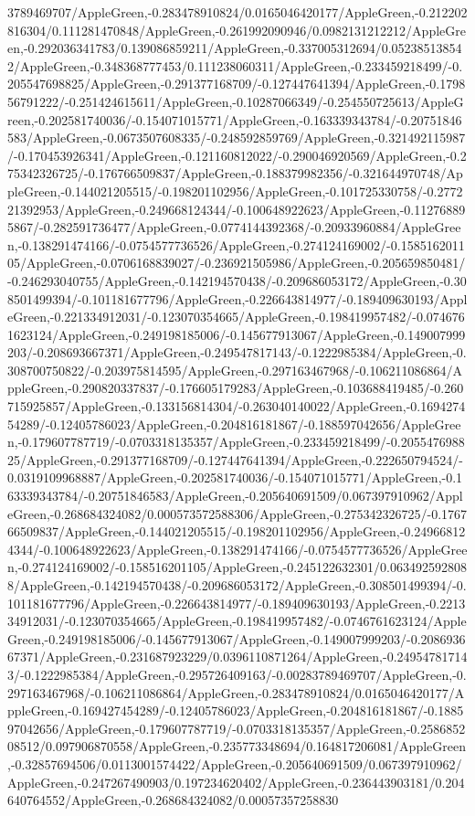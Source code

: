 {\begin{tikzternal}
{3789469707/AppleGreen,-0.283478910824/0.0165046420177/AppleGreen,-0.212202816304/0.111281470848/AppleGreen,-0.261992090946/0.0982131212212/AppleGreen,-0.292036341783/0.139086859211/AppleGreen,-0.337005312694/0.052385138542/AppleGreen,-0.348368777453/0.111238060311/AppleGreen,-0.233459218499/-0.205547698825/AppleGreen,-0.291377168709/-0.127447641394/AppleGreen,-0.179856791222/-0.251424615611/AppleGreen,-0.10287066349/-0.254550725613/AppleGreen,-0.202581740036/-0.154071015771/AppleGreen,-0.163339343784/-0.20751846583/AppleGreen,-0.0673507608335/-0.248592859769/AppleGreen,-0.321492115987/-0.170453926341/AppleGreen,-0.121160812022/-0.290046920569/AppleGreen,-0.275342326725/-0.176766509837/AppleGreen,-0.188379982356/-0.321644970748/AppleGreen,-0.144021205515/-0.198201102956/AppleGreen,-0.101725330758/-0.277221392953/AppleGreen,-0.249668124344/-0.100648922623/AppleGreen,-0.112768895867/-0.282591736477/AppleGreen,-0.0774144392368/-0.20933960884/AppleGreen,-0.138291474166/-0.0754577736526/AppleGreen,-0.274124169002/-0.158516201105/AppleGreen,-0.0706168839027/-0.236921505986/AppleGreen,-0.205659850481/-0.246293040755/AppleGreen,-0.142194570438/-0.209686053172/AppleGreen,-0.308501499394/-0.101181677796/AppleGreen,-0.226643814977/-0.189409630193/AppleGreen,-0.221334912031/-0.123070354665/AppleGreen,-0.198419957482/-0.0746761623124/AppleGreen,-0.249198185006/-0.145677913067/AppleGreen,-0.149007999203/-0.208693667371/AppleGreen,-0.249547817143/-0.1222985384/AppleGreen,-0.308700750822/-0.203975814595/AppleGreen,-0.297163467968/-0.106211086864/AppleGreen,-0.290820337837/-0.176605179283/AppleGreen,-0.103688419485/-0.260715925857/AppleGreen,-0.133156814304/-0.263040140022/AppleGreen,-0.169427454289/-0.12405786023/AppleGreen,-0.204816181867/-0.188597042656/AppleGreen,-0.179607787719/-0.0703318135357/AppleGreen,-0.233459218499/-0.205547698825/AppleGreen,-0.291377168709/-0.127447641394/AppleGreen,-0.222650794524/-0.0319109968887/AppleGreen,-0.202581740036/-0.154071015771/AppleGreen,-0.163339343784/-0.20751846583/AppleGreen,-0.205640691509/0.067397910962/AppleGreen,-0.268684324082/0.000573572588306/AppleGreen,-0.275342326725/-0.176766509837/AppleGreen,-0.144021205515/-0.198201102956/AppleGreen,-0.249668124344/-0.100648922623/AppleGreen,-0.138291474166/-0.0754577736526/AppleGreen,-0.274124169002/-0.158516201105/AppleGreen,-0.245122632301/0.0634925928088/AppleGreen,-0.142194570438/-0.209686053172/AppleGreen,-0.308501499394/-0.101181677796/AppleGreen,-0.226643814977/-0.189409630193/AppleGreen,-0.221334912031/-0.123070354665/AppleGreen,-0.198419957482/-0.0746761623124/AppleGreen,-0.249198185006/-0.145677913067/AppleGreen,-0.149007999203/-0.208693667371/AppleGreen,-0.231687923229/0.0396110871264/AppleGreen,-0.249547817143/-0.1222985384/AppleGreen,-0.295726409163/-0.00283789469707/AppleGreen,-0.297163467968/-0.106211086864/AppleGreen,-0.283478910824/0.0165046420177/AppleGreen,-0.169427454289/-0.12405786023/AppleGreen,-0.204816181867/-0.188597042656/AppleGreen,-0.179607787719/-0.0703318135357/AppleGreen,-0.258685208512/0.097906870558/AppleGreen,-0.235773348694/0.164817206081/AppleGreen,-0.32857694506/0.0113001574422/AppleGreen,-0.205640691509/0.067397910962/AppleGreen,-0.247267490903/0.197234620402/AppleGreen,-0.236443903181/0.204640764552/AppleGreen,-0.268684324082/0.00057357258830}
\end{tikzternal}}
